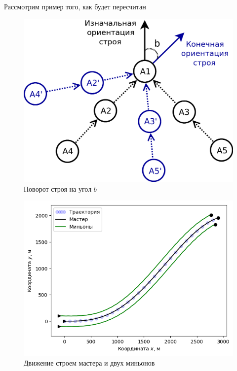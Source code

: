 \documentclass[12pt,a4paper]{article}
\begin{document}
\par
Рассмотрим пример того, как будет пересчитан
\begin{figure}[!htbp]
	\centering
	\includegraphics[width=0.5\linewidth]{platoon/wedge-platoon-rotation}
	\caption{Поворот строя на угол $b$}
	\label{fig:wedge-platoon-rotation}
\end{figure}


\begin{figure}[!htbp]
	\centering
	\includegraphics[width=0.7\linewidth]{platoon-trajectory-0}
	\caption{Движение строем мастера и двух миньонов}
	\label{fig:platoon-trajectory-0}
\end{figure}
\end{document}
